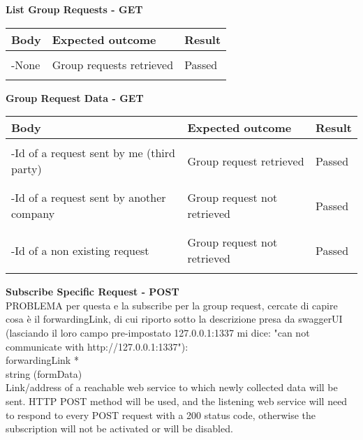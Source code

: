 \textbf{List Group Requests - GET}
\begin{center}
	\begin{tabular}{|p{}|p{}|p{}|}
		\hline
		Body & Expected outcome & Result \\
		\hline
		&&\\
		-None  &Group requests retrieved&Passed\\
		&&\\
		\hline
	\end{tabular}
\end{center}
\textbf{Group Request Data - GET}
\begin{center}
	\begin{tabular}{|p{}|p{}|p{}|}
		\hline
		Body & Expected outcome & Result \\
		\hline
		&&\\
		-Id of a request sent by me (third party)  &Group request retrieved&Passed\\
		&&\\
		\hline
		&&\\
		-Id of a request sent by another company  &Group request not retrieved&Passed\\
		&&\\
		\hline
		&&\\
		-Id of a non existing request  &Group request not retrieved&Passed\\
		&&\\
		\hline
	\end{tabular}
\end{center}
\newpage
\textbf{Subscribe Specific Request - POST}
\\PROBLEMA per questa e la subscribe per la group request, cercate di capire cosa è il forwardingLink, di cui riporto sotto la descrizione presa da swaggerUI (lasciando il loro campo pre-impostato 127.0.0.1:1337 mi dice: "can not communicate with http://127.0.0.1:1337"): 
\\forwardingLink *
\\string (formData)	
\\Link/address of a reachable web service to which newly collected data will be sent. HTTP POST method will be used, and the listening web service will need to respond to every POST request with a 200 status code, otherwise the subscription will not be activated or will be disabled. 

